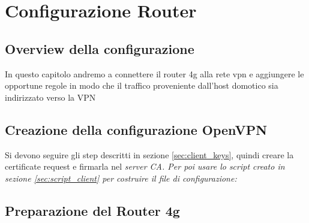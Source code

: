 
\chapter{Configurazione Router}

\section{Overview della configurazione}

In questo capitolo andremo a connettere il router 4g alla rete vpn e aggiungere le opportune regole in modo che il traffico proveniente dall'host domotico sia indirizzato verso la VPN

\section{Creazione della configurazione OpenVPN}

Si devono seguire gli step descritti in sezione \ref{sec:client_keys}, quindi creare la certificate request e firmarla nel \it{server CA}. Per poi usare lo script creato in sezione \ref{sec:script_client} per costruire il file di configurazione:



\section{Preparazione del Router 4g}

